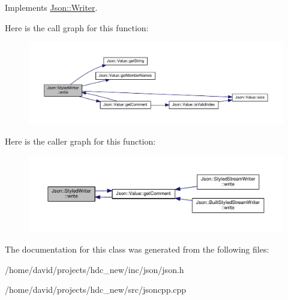 Implements \hyperlink{class_json_1_1_writer}{Json\+::\+Writer}.



Here is the call graph for this function\+:
\nopagebreak
\begin{figure}[H]
\begin{center}
\leavevmode
\includegraphics[width=350pt]{class_json_1_1_styled_writer_a5efab19b9746da9920c29cdae3a6b404_cgraph}
\end{center}
\end{figure}




Here is the caller graph for this function\+:
\nopagebreak
\begin{figure}[H]
\begin{center}
\leavevmode
\includegraphics[width=350pt]{class_json_1_1_styled_writer_a5efab19b9746da9920c29cdae3a6b404_icgraph}
\end{center}
\end{figure}




The documentation for this class was generated from the following files\+:\begin{DoxyCompactItemize}
\item 
/home/david/projects/hdc\+\_\+new/inc/json/json.\+h\item 
/home/david/projects/hdc\+\_\+new/src/jsoncpp.\+cpp\end{DoxyCompactItemize}
